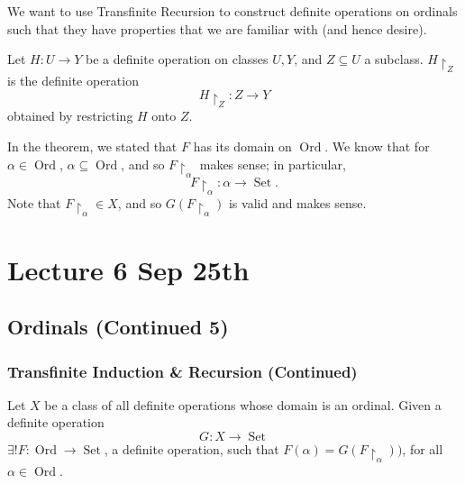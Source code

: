 \documentclass[notoc,notitlepage]{tufte-book}
\DeclareMathOperator{\Ord}{Ord }
\DeclareMathOperator{\Set}{Set }
\begin{document}
We want to use Transfinite Recursion to construct definite operations on ordinals such that they have properties that we are familiar with (and hence desire).

\begin{note}
  Let $H : U \to Y$ be a definite operation on classes $U, Y$, and $Z \subseteq U$ a subclass. $H \restriction_{Z}$ is the definite operation
  \begin{equation*}
    H \restriction_{Z} : Z \to Y
  \end{equation*}
  obtained by restricting $H$ onto $Z$.
\end{note}

\begin{note}
  In the theorem, we stated that $F$ has its domain on $\Ord$. We know that for $\alpha \in \Ord$, $\alpha \subseteq \Ord$, and so $F \restriction_{\alpha}$ makes sense; in particular,
  \begin{equation*}
    F \restriction_{\alpha} : \alpha \to \Set.
  \end{equation*}
  Note that $F \restriction_{\alpha} \in X$, and so $G(F \restriction_{\alpha})$ is valid and makes sense.
\end{note}




\chapter{Lecture 6 Sep 25th}%
\label{chp:lecture_6_sep_25th}

\section{Ordinals (Continued 5)}%
\label{sec:ordinals_continued_5}

\subsection{Transfinite Induction \& Recursion (Continued)}%
\label{sub:transfinite_induction_n_recursion_continued}

\begin{thm}
\label{thm:transfinite_recursion_v1}
  Let $X$ be a class of all definite operations whose domain is an ordinal. Given a definite operation
  \begin{equation*}
    G : X \to \Set
  \end{equation*}
  $\exists ! F : \Ord \to \Set$, a definite operation, such that $F(\alpha) = G(F \restriction_{\alpha}))$, for all $\alpha \in \Ord$.
\end{thm}
\end{document}
